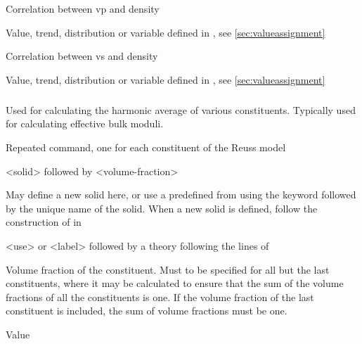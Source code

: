 {
 \slist
   \item \Description Correlation between vp and density
   \item \Argument Value, trend, distribution or variable defined in , see \autoref{sec:valueassignment}
   \item {}
 \elist

 \slist
   \item \Description Correlation between vs and density
   \item \Argument Value, trend, distribution or variable defined in , see \autoref{sec:valueassignment}
   \item {}
 \elist

\subparagraph{}
 \slist
   \item \Description Used for calculating the harmonic average of various constituents. Typically used for calculating effective bulk moduli. 
   \item \Argument
   \item \Default 
 \elist

 \slist
   \item \Description Repeated command, one for each constituent of the Reuss model
   \item \Argument <solid> followed by <volume-fraction>
   \item \Default
 \elist

 \slist
   \item \Description May define a new solid here, or use a predefined  from  using the keyword  followed by the unique name of the solid. When a new solid is defined, follow the construction of  in 
   \item \Argument <use> or <label> followed by a theory following the lines of 
   \item \Default
 \elist

 \slist
   \item \Description Volume fraction of the constituent. Must to be specified for all but the last constituents, where it may be calculated to ensure that the sum of the volume fractions of all the constituents is one. If the volume fraction of the last constituent is included, the sum of volume fractions must be one. 
   \item \Argument Value
   \item \Default
 \elist

}
